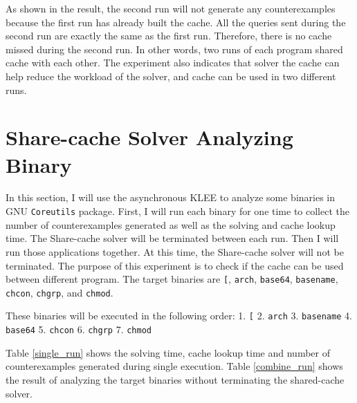 As shown in the result, the second run will not generate any counterexamples because the first run has already built the cache. All the queries sent during the second run are exactly the same as the first run. Therefore, there is no cache missed during the second run. In other words, two runs of each program shared cache with each other. The experiment also indicates that solver the cache can help reduce the workload of the solver, and cache can be used in two different runs.

\section{Share-cache Solver Analyzing Binary}
In this section, I will use the asynchronous KLEE to analyze some binaries in GNU \texttt{Coreutils} package. First, I will run each binary for one time to collect the number of counterexamples generated as well as the solving and cache lookup time. The Share-cache solver will be terminated between each run. Then I will run those applications together. At this time, the Share-cache solver will not be terminated. The purpose of this experiment is to check if the cache can be used between different program. The target binaries are \texttt{[}, \texttt{arch}, \texttt{base64}, \texttt{basename}, \texttt{chcon}, \texttt{chgrp}, and \texttt{chmod}. 

These binaries will be executed in the following order: 1. \texttt{[} 2. \texttt{arch} 3. \texttt{basename} 4. \texttt{base64} 5. \texttt{chcon} 6. \texttt{chgrp} 7. \texttt{chmod}

Table \ref{single_run} shows the solving time, cache lookup time and number of counterexamples generated during single execution. Table \ref{combine_run} shows the result of analyzing the target binaries without terminating the shared-cache solver.

